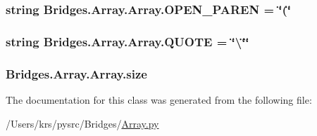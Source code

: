 \subsubsection[{O\+P\+E\+N\+\_\+\+P\+A\+R\+E\+N}]{\setlength{\rightskip}{0pt plus 5cm}string Bridges.\+Array.\+Array.\+O\+P\+E\+N\+\_\+\+P\+A\+R\+E\+N = \char`\"{}(\char`\"{}\hspace{0.3cm}{\ttfamily [static]}}\label{class_bridges_1_1_array_1_1_array_a06552399334bd07d4ca2f6fd78620bba}
\hypertarget{class_bridges_1_1_array_1_1_array_ac5dec20ef3cb532ebf9958795fe1e6ba}{}
\subsubsection[{Q\+U\+O\+T\+E}]{\setlength{\rightskip}{0pt plus 5cm}string Bridges.\+Array.\+Array.\+Q\+U\+O\+T\+E = \char`\"{}\textbackslash{}\char`\"{}\char`\"{}\hspace{0.3cm}{\ttfamily [static]}}\label{class_bridges_1_1_array_1_1_array_ac5dec20ef3cb532ebf9958795fe1e6ba}
\hypertarget{class_bridges_1_1_array_1_1_array_a63534e5d3bdcfbc18950ae0db5d7247c}{}
\subsubsection[{size}]{\setlength{\rightskip}{0pt plus 5cm}Bridges.\+Array.\+Array.\+size}\label{class_bridges_1_1_array_1_1_array_a63534e5d3bdcfbc18950ae0db5d7247c}


The documentation for this class was generated from the following file\+:\begin{DoxyCompactItemize}
\item 
/\+Users/krs/pysrc/\+Bridges/\hyperlink{_array_8py}{Array.\+py}\end{DoxyCompactItemize}
